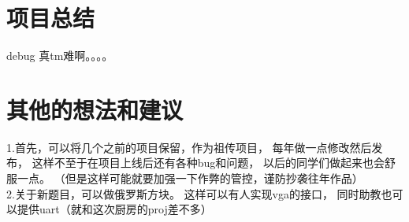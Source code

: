 \documentclass[12pt, a4paper]{ctexart}
\begin{document}
\section{项目总结}
debug 真tm难啊。。。。


\section{其他的想法和建议}
1.首先，可以将几个之前的项目保留，作为祖传项目，
每年做一点修改然后发布，
这样不至于在项目上线后还有各种bug和问题，
以后的同学们做起来也会舒服一点。
（但是这样可能就要加强一下作弊的管控，谨防抄袭往年作品）\\
2.关于新题目，可以做俄罗斯方块。
这样可以有人实现vga的接口，
同时助教也可以提供uart（就和这次厨房的proj差不多）
\end{document}
